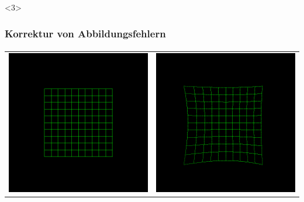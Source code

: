 \documentclass{beamer}
\begin{document}
\begin{frame}<3>
  \frametitle{Korrektur von Abbildungsfehlern}
  \framesubtitle{}
  
  \begin{center}
    \begin{table}[]
      \begin{tabular}{cc}
        \includegraphics[trim={55 55 55 55},clip,scale=0.35]{original}  & \includegraphics[trim={55 55 55 55},clip,scale=0.35]{distortionfull} \\

\end{tabular}
\end{table}
\end{center}
\end{frame}
\end{document}
